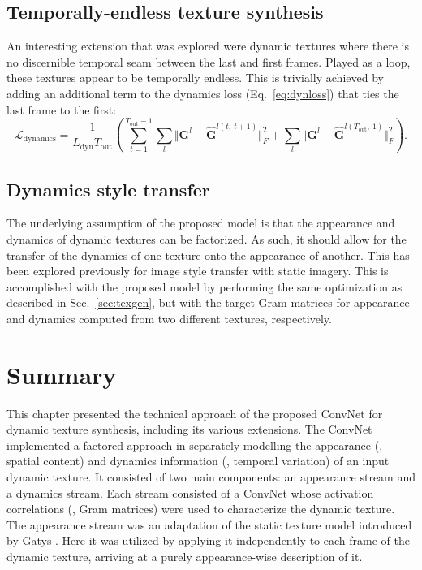 

\subsection{Temporally-endless texture synthesis}\label{sec:temporally_endless_synthesis}

An interesting extension that was explored were dynamic textures where there is no discernible temporal seam between the last and first frames. Played as a loop, these textures appear to be temporally endless. This is trivially achieved by adding an additional term to the dynamics loss (Eq.\ \ref{eq:dynloss}) that ties the last frame to the first:
\begin{equation}
	\mathcal{L}_\text{dynamics} = \frac{1}{L_\text{dyn} T_\text{out}}\left(\sum_{t=1}^{T_\text{out}-1} \sum_{l}  \Vert \mathbf{G}^l - \hat{\mathbf{G}}^{l(t,\ t+1)}\Vert^2_F + \sum_{l}  \Vert \mathbf{G}^l - \hat{\mathbf{G}}^{l(T_\text{out},\ 1)}\Vert^2_F\right).
\end{equation}

\subsection{Dynamics style transfer}

The underlying assumption of the proposed model is that the appearance
and dynamics of dynamic textures can be factorized.
As such, it should allow for the transfer of the dynamics of
one texture onto the appearance of another.
This has been explored previously for image style transfer
\cite{champandard2016,gatys2017} with static imagery.
This is accomplished with the proposed model by performing the same 
optimization as described in Sec.\ \ref{sec:texgen}, but with the target Gram matrices for 
appearance and dynamics computed from two different textures, respectively.

\section{Summary}

This chapter presented the technical approach of the proposed ConvNet for dynamic texture synthesis, including its various extensions. The ConvNet implemented a factored approach in separately modelling the appearance (\ie, spatial content) and dynamics information (\ie, temporal variation) of an input dynamic texture. It consisted of two main components: an appearance stream and a dynamics stream. Each stream consisted of a ConvNet whose activation correlations (\ie, Gram matrices) were used to characterize the dynamic texture. The appearance stream was an adaptation of the static texture model introduced by Gatys \etal \cite{gatys2015}. Here it was utilized by applying it independently to each frame of the dynamic texture, arriving at a purely appearance-wise description of it.

